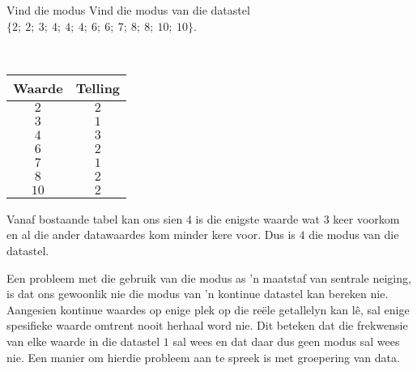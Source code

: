 \begin{wex}{Vind die modus}
{Vind die modus van die datastel $\{2;\ 2;\ 3;\ 4;\ 4;\ 4;\ 6;\ 6;\ 7;\ 8;\ 8;\ 10;\ 10\}$.}
{
\\
  \begin{center}
    \begin{tabular}{|c|c|} \hline
      \textbf{Waarde} & \textbf{Telling} \\ \hline

      $2$ & $2$ \\ \hline
      $3$ & $1$ \\\hline 
      $4$ & $3$ \\\hline
      $6$ & $2$ \\\hline
      $7$ & $1$ \\\hline
      $8$ & $2$ \\\hline
      $10$ & $2$ \\\hline

    \end{tabular}
  \end{center}


  Vanaf bostaande tabel kan ons sien $4$ is die enigste waarde wat $3$ keer voorkom en al die ander datawaardes kom minder kere voor. Dus is $4$ die modus van die datastel.
}
\end{wex}

Een probleem met die gebruik van die modus as ’n maatstaf van sentrale neiging, is dat ons gewoonlik nie die modus van ’n kontinue datastel kan bereken nie. Aangesien kontinue waardes op enige plek op die reële getallelyn kan lê, sal enige spesifieke waarde omtrent nooit herhaal word nie. Dit beteken dat die frekwensie van elke waarde in die datastel $1$ sal wees en dat daar dus geen modus sal wees nie. Een manier om hierdie probleem aan te spreek is met groepering van data.

